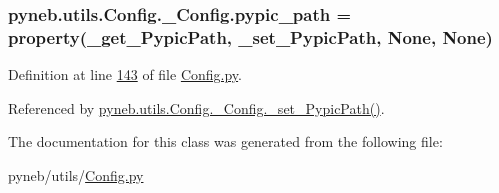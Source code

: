 \subsubsection[{pypic\+\_\+path}]{\setlength{\rightskip}{0pt plus 5cm}pyneb.\+utils.\+Config.\+\_\+\+Config.\+pypic\+\_\+path = property({\bf \+\_\+get\+\_\+\+Pypic\+Path}, {\bf \+\_\+set\+\_\+\+Pypic\+Path}, None, None)\hspace{0.3cm}{\ttfamily [static]}}\label{classpyneb_1_1utils_1_1_config_1_1___config_a5276927da3588ffb009fd79f282c6d3c}


Definition at line \hyperlink{_config_8py_source_l00143}{143} of file \hyperlink{_config_8py_source}{Config.\+py}.



Referenced by \hyperlink{_config_8py_source_l00139}{pyneb.\+utils.\+Config.\+\_\+\+Config.\+\_\+set\+\_\+\+Pypic\+Path()}.



The documentation for this class was generated from the following file\+:\begin{DoxyCompactItemize}
\item 
pyneb/utils/\hyperlink{_config_8py}{Config.\+py}\end{DoxyCompactItemize}
